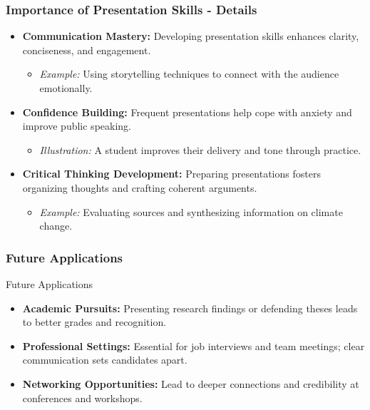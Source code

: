 \documentclass[aspectratio=169]{beamer}
\begin{document}
\begin{frame}[fragile]
    \frametitle{Importance of Presentation Skills - Details}
    \begin{itemize}
        \item \textbf{Communication Mastery:} 
        Developing presentation skills enhances clarity, conciseness, and engagement.
        \begin{itemize}
            \item \textit{Example:} Using storytelling techniques to connect with the audience emotionally.
        \end{itemize}
        \item \textbf{Confidence Building:} 
        Frequent presentations help cope with anxiety and improve public speaking.
        \begin{itemize}
            \item \textit{Illustration:} A student improves their delivery and tone through practice.
        \end{itemize}
        \item \textbf{Critical Thinking Development:} 
        Preparing presentations fosters organizing thoughts and crafting coherent arguments.
        \begin{itemize}
            \item \textit{Example:} Evaluating sources and synthesizing information on climate change.
        \end{itemize}
    \end{itemize}
\end{frame}

\begin{frame}[fragile]
    \frametitle{Future Applications}
    \begin{block}{Future Applications}
        \begin{itemize}
            \item \textbf{Academic Pursuits:} 
            Presenting research findings or defending theses leads to better grades and recognition.
            \item \textbf{Professional Settings:} 
            Essential for job interviews and team meetings; clear communication sets candidates apart.
            \item \textbf{Networking Opportunities:} 
            Lead to deeper connections and credibility at conferences and workshops.
        \end{itemize}
    \end{block}
\end{frame}
\end{document}
